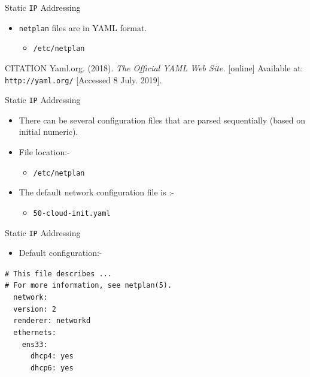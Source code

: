 \documentclass[aspectratio=169]{beamer}
\begin{document}
\begin{frame}{Static \texttt{IP} Addressing}
  \begin{itemize}
    \item \texttt{netplan} files are in YAML format.
    \begin{itemize}
      \item \texttt{/etc/netplan}
    \end{itemize} 
  \end{itemize}
  \begin{block}{CITATION}
    Yaml.org. (2018). \textit{The Official YAML Web Site.} [online] Available at: \texttt{http://yaml.org/} [Accessed 8 July. 2019].
  \end{block}
\end{frame}

\begin{frame}{Static \texttt{IP} Addressing}
  \begin{itemize}
    \item There can be several configuration files that are parsed sequentially (based on initial numeric).
    \item File location:-
    \begin{itemize}
      \item \texttt{/etc/netplan}
    \end{itemize} 
    \item The default network configuration file is :-
    \begin{itemize}
      \item \texttt{50-cloud-init.yaml}
    \end{itemize} 
  \end{itemize}
\end{frame}

\begin{frame}{Static \texttt{IP} Addressing}
  \begin{itemize}
    \item Default configuration:-
  \end{itemize}
    \begin{center}
      \begin{minipage}{8cm}
        \begin{block}{}
          \texttt{\# This file describes ...\\
          \# For more information, see netplan(5).\\
          ~~network:\\
          ~~version: 2\\
          ~~renderer: networkd\\
          ~~ethernets:\\
          ~~~~ens33:\\
          ~~~~~~dhcp4: yes\\
          ~~~~~~dhcp6: yes}
        \end{block}
      \end{minipage}
    \end{center}
\end{frame}
\end{document}

